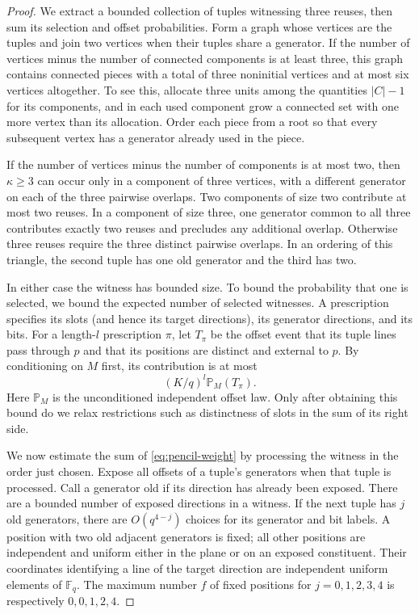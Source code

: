 \begin{proof}
We extract a bounded collection of tuples witnessing three reuses, then
sum its selection and offset probabilities.  Form a graph whose vertices
are the tuples and join two vertices when their tuples share a generator.
If the number of vertices minus the number of connected components is at
least three, this graph
contains connected pieces with a total of three noninitial vertices and
at most six vertices altogether.  To see this, allocate three units among
the quantities $|C|-1$ for its components, and in each used component grow
a connected set with one more vertex than its allocation.  Order each
piece from a root so that every subsequent vertex has a generator already
used in the piece.

If the number of vertices minus the number of components is at most two,
then $\kappa\ge3$ can occur only in a component of three vertices, with a
different generator on each of the three pairwise overlaps.  Two components
of size two contribute at most two reuses.  In a component of size three,
one generator common to all three contributes exactly two reuses and
precludes any additional overlap.  Otherwise three reuses require the
three distinct pairwise overlaps.  In an ordering of this triangle, the
second tuple has one old generator and the third has two.

In either case the witness has bounded size.  To bound the probability
that one is selected, we bound the expected number of selected witnesses.
A prescription specifies its slots (and hence its target directions),
its generator directions, and its bits.
For a length-$l$ prescription $\pi$, let $T_\pi$ be the offset event that
its tuple lines pass through $p$ and that its positions are distinct and
external to $p$.  By conditioning on $M$ first, its contribution is at most
\begin{equation}\label{eq:pencil-weight}
 (K/q)^l\mathbb P_M(T_\pi).
\end{equation}
Here $\mathbb P_M$ is the unconditioned independent offset law.  Only
after obtaining this bound do we relax restrictions such as distinctness
of slots in the sum of its right side.

We now estimate the sum of \eqref{eq:pencil-weight} by processing the
witness in the order just chosen.  Expose all offsets of a tuple's
generators when that tuple is processed.  Call a generator old if its
direction has already been exposed.  There are a bounded number of
exposed directions in a witness.  If the next tuple has $j$ old generators,
there are $O(q^{4-j})$ choices for its
generator and bit labels.  A position with two old adjacent generators
is fixed; all other positions are independent and uniform either in the
plane or on an exposed constituent.  Their coordinates identifying a
line of the target direction are independent uniform elements of
$\mathbb F_q$.  The maximum number $f$ of fixed positions for
$j=0,1,2,3,4$ is respectively $0,0,1,2,4$.


\end{proof}
